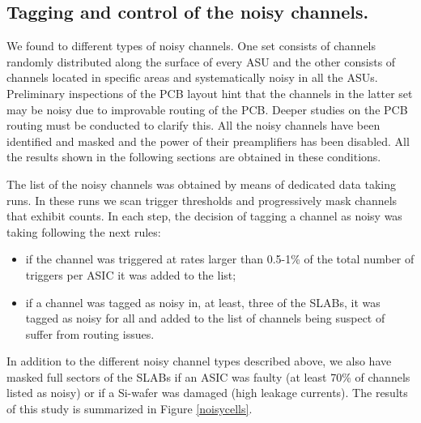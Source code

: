 \documentclass[a4paper,11pt]{article}
\begin{document}
\subsection{Tagging and control of the noisy channels.}
\label{sec:comm_noise}

We found to different types of noisy channels. One set consists of
channels randomly distributed along the surface of every ASU and the other consists
of channels located in specific areas and systematically noisy in all the ASUs. Preliminary inspections of the PCB layout
hint that the channels in the latter set may be noisy due to
improvable routing of the PCB.
Deeper studies on the PCB routing must be conducted to clarify this.
All the noisy channels have been identified and masked and the power
of their preamplifiers has been disabled. All the results shown in the following
sections are obtained in these conditions.

The list of the noisy channels was
obtained by means of dedicated data taking runs. In these runs
we scan trigger thresholds and progressively mask channels that exhibit counts. 
In each step, the decision of tagging a channel as noisy was taking following the next rules:

\begin{itemize}
\item if the channel was triggered at rates larger than 0.5-1\% of the total number of triggers per ASIC it was added to the list;
\item if a channel was tagged as noisy in, at least, three of the SLABs, it was tagged as noisy for all and added to the list of channels being suspect of suffer from routing issues.
\end{itemize}

In addition to the different noisy channel types described above, we also have
masked full sectors of the SLABs if an ASIC was faulty (at least 70\% of channels 
listed as noisy) or if a Si-wafer was damaged (high leakage currents).
The results of this study is summarized in Figure \ref{noisycells}.
\end{document}
